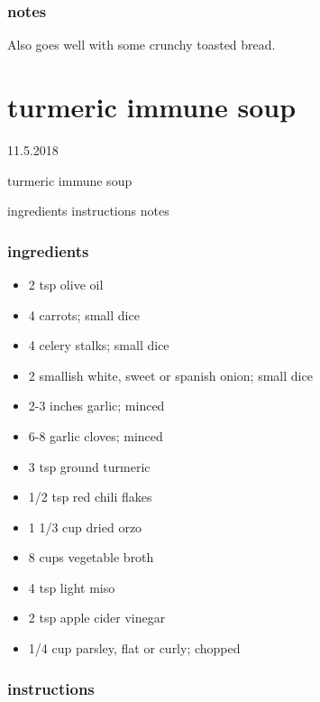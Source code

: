 \documentclass[]{book}
\providecommand{\tightlist}{%
  \setlength{\itemsep}{0pt}\setlength{\parskip}{0pt}}
\begin{document}
\hypertarget{notes-18}{%
\subsection{notes}\label{notes-18}}

Also goes well with some crunchy toasted bread.

\hypertarget{turmeric-immune-soup}{%
\chapter{turmeric immune soup}\label{turmeric-immune-soup}}

11.5.2018

turmeric immune soup

ingredients \textbar{}
instructions \textbar{}
notes

\hypertarget{ingredients-19}{%
\subsection{ingredients}\label{ingredients-19}}

\begin{itemize}
\tightlist
\item
  2 tsp olive oil
\item
  4 carrots; small dice
\item
  4 celery stalks; small dice
\item
  2 smallish white, sweet or spanish onion; small dice
\item
  2-3 inches garlic; minced
\item
  6-8 garlic cloves; minced
\item
  3 tsp ground turmeric
\item
  1/2 tsp red chili flakes
\item
  1 1/3 cup dried orzo
\item
  8 cups vegetable broth
\item
  4 tsp light miso
\item
  2 tsp apple cider vinegar
\item
  1/4 cup parsley, flat or curly; chopped
\end{itemize}

\hypertarget{instructions-19}{%
\subsection{instructions}\label{instructions-19}}
\end{document}
